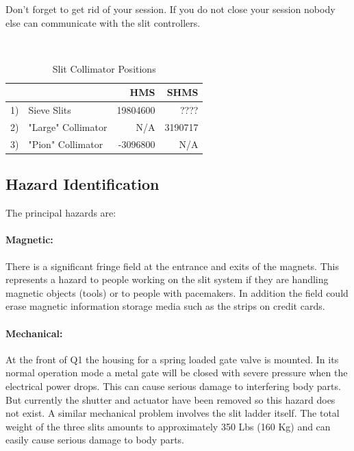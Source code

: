 {Don't forget to get rid of your session. If you do not close your session nobody
else can communicate with the slit controllers.


\begin{table}[!ht]\
\caption{Slit Collimator Positions\label{tab:col_pos}}
\begin{center}
\begin{tabular}{rlrr}
   &                  &     HMS   & SHMS\\
\hline
1) & Sieve Slits      &  19804600 &  ????\\
2) & "Large" Collimator &       N/A &   3190717\\
3) & "Pion" Collimator  &  -3096800 &       N/A\\
\end{tabular}
\end{center}
\end{table}

   
\subsection{Hazard Identification}

The principal hazards are:
\paragraph{Magnetic:} There is a significant fringe field at
the entrance and exits of the magnets. This represents a hazard
to people working on the slit system if they are handling magnetic
objects (tools) or to people with pacemakers. In addition the field could erase magnetic
information storage media such as the strips on credit cards.
\paragraph{Mechanical:} At the front of Q1 the housing for a spring loaded gate valve is
mounted. In its normal operation mode a metal gate will be closed with
severe pressure when the electrical power drops. This can cause serious
damage to interfering body parts.  But currently the shutter and
actuator have been removed so this hazard does not exist.  
A similar mechanical problem involves the slit ladder itself. The total weight of
the three slits amounts to approximately 350 Lbs (160 Kg) and can easily
cause serious damage to body parts.

}

